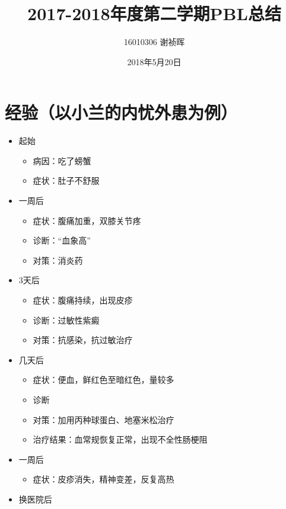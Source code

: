 \documentclass[]{article}
\title{2017-2018年度第二学期PBL总结}
\author{16010306 谢祯晖}
\date{2018年5月20日}
\providecommand{\tightlist}{%
  \setlength{\itemsep}{0pt}\setlength{\parskip}{0pt}}
\begin{document}
\maketitle

\section{经验（以小兰的内忧外患为例）}\label{ux7ecfux9a8cux4ee5ux5c0fux5170ux7684ux5185ux5fe7ux5916ux60a3ux4e3aux4f8b}

\begin{multicols}{3}
\begin{itemize}
\tightlist
\item
  起始

  \begin{itemize}
  \tightlist
  \item
    病因：吃了螃蟹
  \item
    症状：肚子不舒服
  \end{itemize}
\item
  一周后

  \begin{itemize}
  \tightlist
  \item
    症状：腹痛加重，双膝关节疼
  \item
    诊断：``血象高''
  \item
    对策：消炎药
  \end{itemize}
\item
  3天后

  \begin{itemize}
  \tightlist
  \item
    症状：腹痛持续，出现皮疹
  \item
    诊断：过敏性紫癜
  \item
    对策：抗感染，抗过敏治疗
  \end{itemize}
\item
  几天后

  \begin{itemize}
  \tightlist
  \item
    症状：便血，鲜红色至暗红色，量较多
  \item
    诊断
  \item
    对策：加用丙种球蛋白、地塞米松治疗
  \item
    治疗结果：血常规恢复正常，出现不全性肠梗阻
  \end{itemize}
\item
  一周后

  \begin{itemize}
  \tightlist
  \item
    症状：皮疹消失，精神变差，反复高热
  \end{itemize}
\item
  换医院后


\end{itemize}
\end{multicols}
\end{document}
